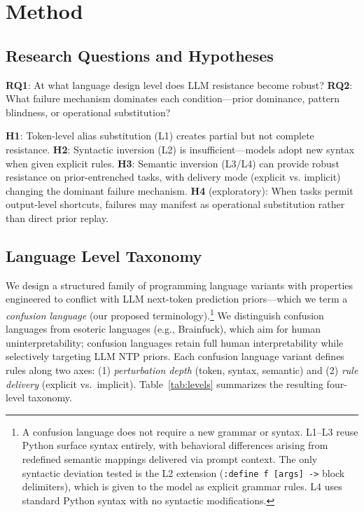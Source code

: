 \section{Method}
\label{sec:method}
\subsection{Research Questions and Hypotheses}
\textbf{RQ1}: At what language design level does LLM resistance become robust?
\textbf{RQ2}: What failure mechanism dominates each condition---prior dominance, pattern blindness, or operational substitution?

\textbf{H1}: Token-level alias substitution (L1) creates partial but not complete resistance.
\textbf{H2}: Syntactic inversion (L2) is insufficient---models adopt new syntax when given explicit rules.
\textbf{H3}: Semantic inversion (L3/L4) can provide robust resistance on prior-entrenched tasks, with delivery mode (explicit vs. implicit) changing the dominant failure mechanism.
\textbf{H4} (exploratory): When tasks permit output-level shortcuts, failures may manifest as operational substitution rather than direct prior replay.

\subsection{Language Level Taxonomy}
We design a structured family of programming language variants with properties engineered to conflict with LLM next-token prediction priors---which we term a \emph{confusion language} (our proposed terminology).\footnote{A confusion language does not require a new grammar or syntax. L1--L3 reuse Python surface syntax entirely, with behavioral differences arising from redefined semantic mappings delivered via prompt context. The only syntactic deviation tested is the L2 extension (\texttt{:define~f~[args]~->} block delimiters), which is given to the model as explicit grammar rules. L4 uses standard Python syntax with no syntactic modifications.} We distinguish confusion languages from esoteric languages (e.g., Brainfuck), which aim for human uninterpretability; confusion languages retain full human interpretability while selectively targeting LLM NTP priors. Each confusion language variant defines rules along two axes: (1) \emph{perturbation depth} (token, syntax, semantic) and (2) \emph{rule delivery} (explicit vs.\ implicit). Table~\ref{tab:levels} summarizes the resulting four-level taxonomy.

